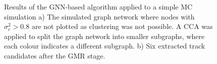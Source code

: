 \begin{figure}[htbp]%
    \centering
    \hfill
    \caption{Results of the GNN-based algorithm applied to a simple MC simulation a) The simulated graph network where nodes with $\sigma_e^2 > 0.8$ are not plotted as clustering was not possible. A CCA was applied to split the graph network into smaller subgraphs, where each colour indicates a different subgraph. b) Six extracted track candidates after the GMR stage.}%
    \label{fig:example-application-2}%
\end{figure}

